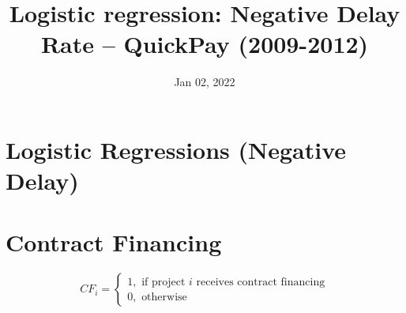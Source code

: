 \documentclass[
]{article}
\title{Logistic regression: Negative Delay Rate -- QuickPay (2009-2012)}
\author{}
\date{\vspace{-2.5em}Jan 02, 2022}
\begin{document}
\maketitle

\hypertarget{logistic-regressions-negative-delay}{%
\section{Logistic Regressions (Negative
Delay)}\label{logistic-regressions-negative-delay}}

\hypertarget{contract-financing}{%
\section{Contract Financing}\label{contract-financing}}

\[ CF_i = \begin{cases} 1, \text{ if project } i \text{ receives contract financing}\\
0, \text{ otherwise} \end{cases}\]
\end{document}
